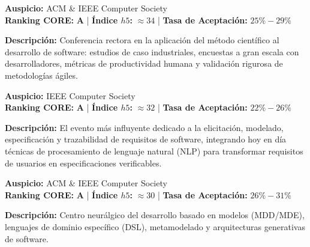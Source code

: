 \documentclass[12pt,a4paper]{article}
\begin{document}
\vspace{0.3cm}

\begin{tcolorbox}[colback=white,colframe=tierA,title={\textbf{9. ESEM -- ACM/IEEE International Symposium on Empirical Software Engineering and Measurement}},fonttitle=\bfseries]
\textbf{Auspicio:} ACM \& IEEE Computer Society \\
\textbf{Ranking CORE:} \textbf{A} \quad | \quad \textbf{Índice $h5$:} $\approx 34$ \quad | \quad \textbf{Tasa de Aceptación:} $25\% - 29\%$
\end{tcolorbox}
\textbf{Descripción:} Conferencia rectora en la aplicación del método científico al desarrollo de software: estudios de caso industriales, encuestas a gran escala con desarrolladores, métricas de productividad humana y validación rigurosa de metodologías ágiles.

\vspace{0.3cm}

\begin{tcolorbox}[colback=white,colframe=tierA,title={\textbf{10. RE -- IEEE International Requirements Engineering Conference}},fonttitle=\bfseries]
\textbf{Auspicio:} IEEE Computer Society \\
\textbf{Ranking CORE:} \textbf{A} \quad | \quad \textbf{Índice $h5$:} $\approx 32$ \quad | \quad \textbf{Tasa de Aceptación:} $22\% - 26\%$
\end{tcolorbox}
\textbf{Descripción:} El evento más influyente dedicado a la elicitación, modelado, especificación y trazabilidad de requisitos de software, integrando hoy en día técnicas de procesamiento de lenguaje natural (NLP) para transformar requisitos de usuarios en especificaciones verificables.

\vspace{0.3cm}

\begin{tcolorbox}[colback=white,colframe=tierA,title={\textbf{11. MODELS -- ACM/IEEE International Conference on Model Driven Engineering}},fonttitle=\bfseries]
\textbf{Auspicio:} ACM \& IEEE Computer Society \\
\textbf{Ranking CORE:} \textbf{A} \quad | \quad \textbf{Índice $h5$:} $\approx 30$ \quad | \quad \textbf{Tasa de Aceptación:} $26\% - 31\%$
\end{tcolorbox}
\textbf{Descripción:} Centro neurálgico del desarrollo basado en modelos (MDD/MDE), lenguajes de dominio específico (DSL), metamodelado y arquitecturas generativas de software.
\end{document}
